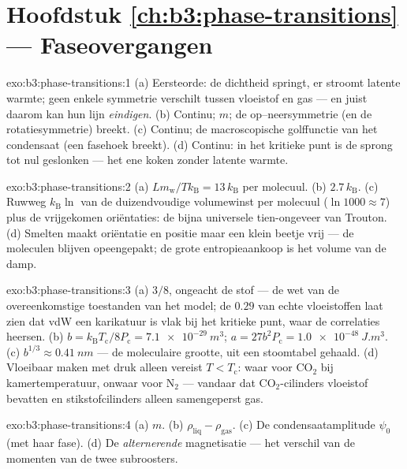 \section*{Hoofdstuk \ref{ch:b3:phase-transitions} --- Faseovergangen}

\begin{solution}{exo:b3:phase-transitions:1}
(a) Eersteorde: de dichtheid springt, er stroomt latente warmte; geen
enkele symmetrie verschilt tussen vloeistof en gas --- en juist daarom kan
hun lijn \emph{eindigen}. (b) Continu;  $m$; de
op--neersymmetrie (en de rotatiesymmetrie) breekt. (c) Continu; de
macroscopische golffunctie van het condensaat (een fasehoek breekt). (d) Continu:
in het kritieke punt is de sprong tot nul geslonken --- het ene
koken zonder latente warmte.
\end{solution}

\begin{solution}{exo:b3:phase-transitions:2}
(a) $Lm_{\text{w}}/Tk_{\text{B}} = 13\,k_{\text{B}}$ per molecuul.
(b) $2.7\,k_{\text{B}}$. (c) Ruwweg $k_{\text{B}}\ln$ van de
duizendvoudige volumewinst per molecuul ($\ln1000 \approx 7$) plus
de vrijgekomen oriëntaties: de bijna universele tien-ongeveer van Trouton. (d)
Smelten maakt oriëntatie en positie maar een klein beetje vrij --- de
moleculen blijven opeengepakt; de grote entropieaankoop is het
volume van de damp.
\end{solution}

\begin{solution}{exo:b3:phase-transitions:3}
(a) $3/8$, ongeacht de stof --- de wet van de overeenkomstige
toestanden van het model; de $0.29$ van echte vloeistoffen laat zien dat
vdW een karikatuur is vlak bij het kritieke punt, waar de correlaties heersen. (b) $b =
k_{\text{B}}T_{\text{c}}/8P_{\text{c}} = \qty{7.1e-29}{m^3}$; $a =
27b^2P_{\text{c}} = \qty{1.0e-48}{J.m^3}$. (c) $b^{1/3} \approx
\qty{0.41}{nm}$ --- de moleculaire grootte, uit een stoomtabel
gehaald. (d) Vloeibaar maken met druk alleen vereist $T <
T_{\text{c}}$: waar voor CO$_2$ bij kamertemperatuur, onwaar voor
N$_2$ --- vandaar dat CO$_2$-cilinders vloeistof bevatten en
stikstofcilinders alleen samengeperst gas.
\end{solution}

\begin{solution}{exo:b3:phase-transitions:4}
(a) $m$. (b) $\rho_{\text{liq}} - \rho_{\text{gas}}$. (c) De
condensaatamplitude $\psi_0$ (met haar fase). (d) De
\emph{alternerende} magnetisatie --- het verschil van de momenten van
de twee subroosters.
\end{solution}

